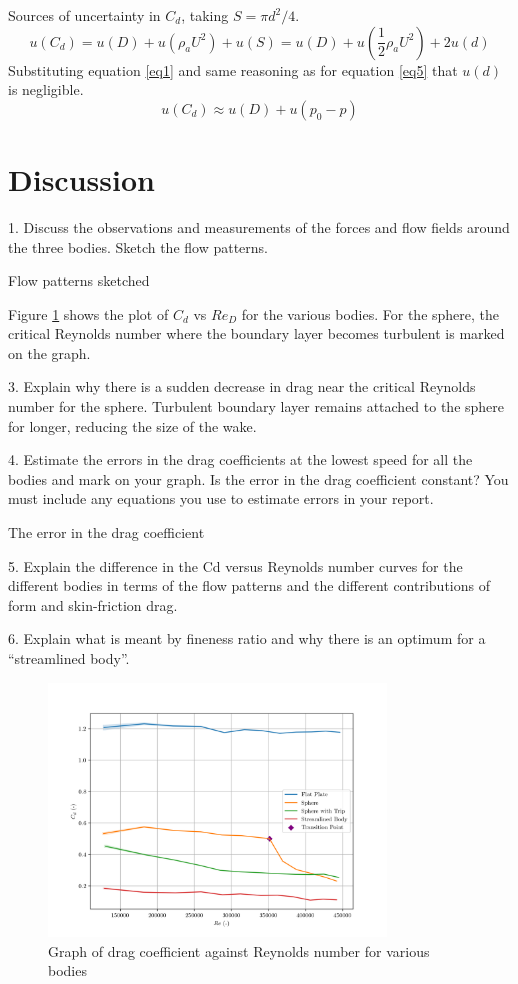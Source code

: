 \documentclass[8pt]{article}
\begin{document}
Sources of uncertainty in $C_d$, taking $S=\pi d^2/4$.
\begin{equation}
    u(C_d) = u(D) + u(\rho_a U^2) + u(S) = u(D) + u(\frac{1}{2}\rho_a U^2) + 2u(d)
\end{equation}
Substituting equation \ref{eq1} and same reasoning as for equation \ref{eq5} that $u(d)$ is negligible.
\begin{equation}
    u(C_d) \approx u(D) + u(p_0-p)
\end{equation}


\section{Discussion}


1. Discuss the observations and measurements of the forces and flow fields around the three
bodies. Sketch the flow patterns.

Flow patterns sketched

Figure \ref{fig:figure1} shows the plot of $C_d$ vs $Re_D$ for the various bodies. 
For the sphere, the critical Reynolds number where the boundary layer becomes turbulent is marked on the graph.

3. Explain why there is a sudden decrease in drag near the critical Reynolds number for the
sphere.
Turbulent boundary layer remains attached to the sphere for longer, reducing the size of the wake.

4. Estimate the errors in the drag coefficients at the lowest speed for all the bodies and
mark on your graph. Is the error in the drag coefficient constant? You must include any
equations you use to estimate errors in your report.

The error in the drag coefficient 

5. Explain the difference in the Cd versus Reynolds number curves for the different bodies in
terms of the flow patterns and the different contributions of form and skin-friction drag.

6. Explain what is meant by fineness ratio and why there is an optimum for a “streamlined
body”.


\begin{figure}[H]
    \centering
    \includegraphics[width=0.8\textwidth]{Re_vs_Cd.png}
    \caption{Graph of drag coefficient against Reynolds number for various bodies}
    \label{fig:figure1}
\end{figure}
\end{document}
